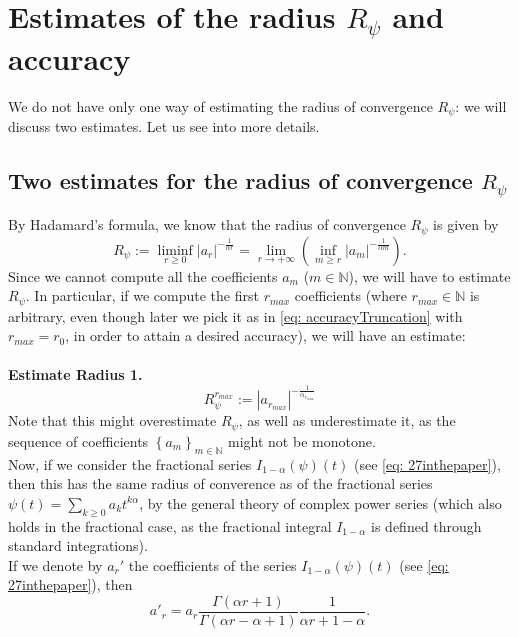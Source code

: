 \documentclass[a4paper,italian,11pt]{book}
\theoremstyle{plain}
\theoremstyle{remark}
\theoremstyle{plain}
\begin{document}
\section{Estimates of the radius $R_\psi$ and accuracy}

We do not have only one way of estimating the radius of convergence $R_\psi$: we will discuss two estimates. Let us see into more details.

\subsection{Two estimates for the radius of convergence $R_\psi$ }
By Hadamard's formula, we know that the radius of convergence $R_\psi$ is given by
$$R_\psi := \liminf_{r\ge 0} |a_r|^{-\frac{1}{\alpha r}} = \lim_{r\to + \infty} \left( \inf_{m\ge r} |a_m|^{-\frac{1}{\alpha m}}\right).  $$
Since we cannot compute all the coefficients $a_m$ ($m \in \mathbb{N}$), we will have to estimate $R_\psi$. In particular, if we compute the first $r_{max}$ coefficients (where $r_{max} \in \mathbb{N}$ is arbitrary, even though later we pick it as in \eqref{eq: accuracyTruncation} with $r_{max} = r_0$, in order to attain a desired accuracy), we will have an estimate:\\
\\
\textbf{Estimate Radius 1.}
\begin{equation}
    \label{eq: estimateRadius4}
    R_\psi ^ {r_{max}} := |a_{r_{max}}|^ {-\frac{1}{\alpha_{r_{max}}}}
\end{equation}
Note that this might overestimate $R_\psi$, as well as underestimate it, as the sequence of coefficients $\left\{ a_m\right\}_{m\in \mathbb{N}}$ might not be monotone. \\ 
Now, if we consider the fractional series $I_{1-\alpha}(\psi)(t)$ (see \eqref{eq: 27inthepaper}), then this has the same radius of converence as of the fractional series $\psi(t) = \sum_{k\ge 0} a_kt^{k\alpha}$, by the general theory of complex power series (which also holds in the fractional case, as the fractional integral $I_{1-\alpha}$ is defined through standard integrations).
\\
If we denote by $a_r'$ the coefficients of the series $I_{1-\alpha}(\psi)(t)$ (see \eqref{eq: 27inthepaper}), then
\begin{equation}
\label{eq: aprimo_R_radius_convergence}
    a'_r = a_r\frac{\Gamma(\alpha r + 1)}{\Gamma(\alpha r - \alpha + 1)} \frac{1}{\alpha r + 1 - \alpha}.
\end{equation}
\\
\end{document}
